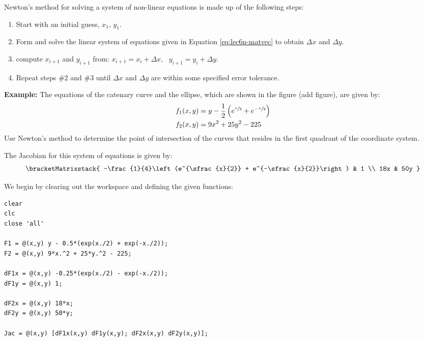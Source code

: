 \vspace{4.0cm}

 Newton's method for solving a system of non-linear equations is made up of the following steps:
\begin{enumerate}
\item Start with an initial guess, $x_1$, $y_1$.
\item Form and solve the linear system of equations given in Equation \ref{eq:lec6n-matvec} to obtain $\Delta x$ and $\Delta y$.
\item compute $x_{i+1}$ and $y_{i+1}$ from: $x_{i+1} = x_{i} + \Delta x, \ \ \ y_{i+1} = y_{i} + \Delta y$.
\item Repeat steps \#2 and \#3 until $\Delta x$ and $\Delta y$ are within some specified error tolerance.
\end{enumerate}

\vspace{0.25cm}

\noindent\textbf{Example:} The equations of the catenary curve and the ellipse, which are shown in the figure (add figure), are given by:
\begin{align*}
f_1(x,y) &= y-\frac{1}{2}\left(e^{\sfrac{x}{2}} + e^{-\sfrac{x}{2}}\right) \\
f_2(x,y) &= 9x^2 + 25y^2 - 225
\end{align*}
Use Newton's method to determine the point of intersection of the curves that resides in the first quadrant of the coordinate system.

\vspace{0.15cm}

\noindent The Jacobian for this system of equations is given by:
\begin{equation*}
\bracketMatrixstack{
-\frac{1}{4}\left(e^{\sfrac{x}{2}} + e^{-\sfrac{x}{2}}\right) & 1 \\
18x & 50y 
}
\end{equation*}

\vspace{0.15cm}

\noindent We begin by clearing out the workspace and defining the given functions:
\begin{lstlisting}[style=myMatlab, name=lec6n-ex1]
clear
clc
close 'all'

F1 = @(x,y) y - 0.5*(exp(x./2) + exp(-x./2));
F2 = @(x,y) 9*x.^2 + 25*y.^2 - 225;

dF1x = @(x,y) -0.25*(exp(x./2) - exp(-x./2));
dF1y = @(x,y) 1;

dF2x = @(x,y) 18*x;
dF2y = @(x,y) 50*y;

Jac = @(x,y) [dF1x(x,y) dF1y(x,y); dF2x(x,y) dF2y(x,y)];
\end{lstlisting}

